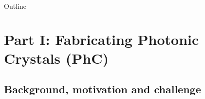 \begin{frame}{Outline}
  \protect\hypertarget{outline}{}
  \tableofcontents
\end{frame}

\hypertarget{part1}{%
  \section{Part I: Fabricating Photonic Crystals (PhC)}}

\hypertarget{background1}{%
  \subsection{Background, motivation and challenge}}

